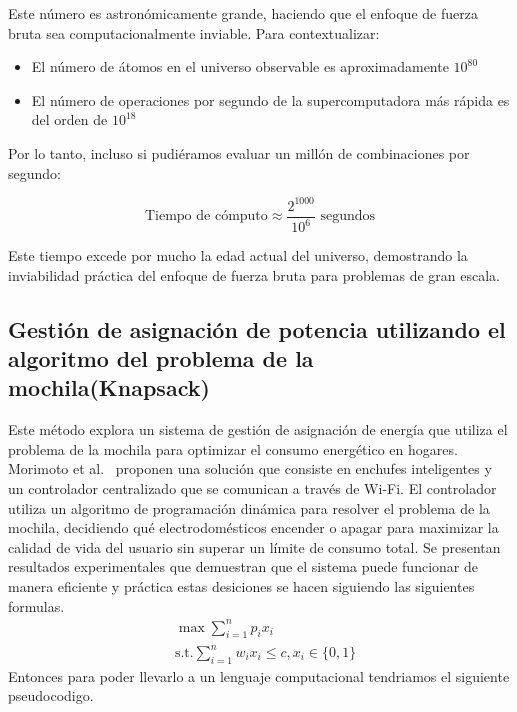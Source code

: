 \documentclass[9pt,a4paper,twoside]{rho-class/rho}
\begin{document}
            Este número es astronómicamente grande, haciendo que el enfoque de fuerza bruta sea computacionalmente inviable. Para contextualizar:

            \begin{itemize}
                \item El número de átomos en el universo observable es aproximadamente $10^{80}$
                \item El número de operaciones por segundo de la supercomputadora más rápida es del orden de $10^{18}$
            \end{itemize}

            Por lo tanto, incluso si pudiéramos evaluar un millón de combinaciones por segundo:

            \begin{equation}
                \text{Tiempo de cómputo} \approx \frac{2^{1000}}{10^6} \text{ segundos}
            \end{equation}

            Este tiempo excede por mucho la edad actual del universo, demostrando la inviabilidad práctica del enfoque de fuerza bruta para problemas de gran escala.
                
        \subsection[Gestión de asignación de potencia (Knapsack)]{Gestión de asignación de potencia utilizando el algoritmo del problema de la mochila(Knapsack)}

            Este método explora un sistema de gestión de asignación de energía que utiliza el problema de la mochila para optimizar el consumo energético en hogares.  Morimoto et al.~\cite{Morimoto2014} proponen una solución que consiste en enchufes inteligentes y un controlador centralizado que se comunican a través de Wi-Fi. El controlador utiliza un algoritmo de programación dinámica para resolver el problema de la mochila, decidiendo qué electrodomésticos encender o apagar para maximizar la calidad de vida del usuario sin superar un límite de consumo total. Se presentan resultados experimentales que demuestran que el sistema puede funcionar de manera eficiente y práctica estas desiciones se hacen siguiendo las siguientes formulas.
            \begin{align}
                &\max \sum_{i=1}^{n} p_ix_i \\
                &\text{s.t.} \sum_{i=1}^{n} w_ix_i \leq c, x_i \in \{0,1\}
            \end{align}
            Entonces para poder llevarlo a un lenguaje computacional tendriamos el siguiente pseudocodigo.
            
\end{document}
